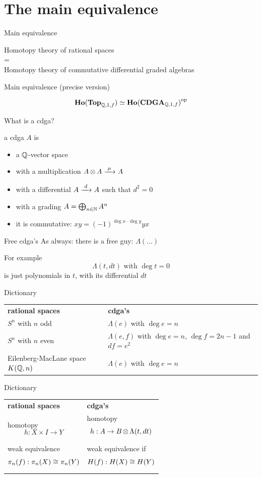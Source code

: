 \documentclass[14pt]{beamer}
\newcommand{\Frame}[2]{
	\begin{frame}{#1}#2\end{frame}
}
\begin{document}
\section{The main equivalence}
\Frame{Main equivalence}{
	\begin{theorem}
	\begin{center}
		Homotopy theory of rational spaces \\
		= \\
		Homotopy theory of commutative differential graded algebras
	\end{center}
	\end{theorem}
}

\Frame{Main equivalence (precise version)}{
	\begin{theorem}
		\[ \mathbf{Ho}(\mathbf{Top}_{\mathbb{Q}, 1, f}) \simeq {\mathbf{Ho}(\mathbf{CDGA}_{\mathbb{Q}, 1, f})}^{\text{op}} \]
	\end{theorem}
}

\Frame{What is a cdga?}{
	\begin{definition}
		a cdga $A$ is
		\begin{itemize}
			\item a $\mathbb{Q}$-vector space
			\item with a multiplication $A \operatorname*{\otimes} A \xrightarrow{\,\,{\mu}\,\,} A$
			\item with a differential $A \xrightarrow{\,\,{d}\,\,} A$ such that $d^2 = 0$
			\item with a grading $A = \bigoplus_{n \in \mathbb{N}} A^n$
			\item it is commutative: $ x y = (-1)^{\deg{x}\cdot\deg{y}} y x $
		\end{itemize}
	\end{definition}
}

\Frame{Free cdga's}{
	As always: there is a free guy: $\Lambda(...)$

	For example
	\[ \Lambda(t, dt) \text{ with } \deg{t} = 0 \]
	is just polynomials in $t$, with its differential $dt$
}

\newcommand{\Dict}[1]{
	\noindent
	\begin{tabularx}{\textwidth}{ X X }
		{\bf rational spaces} & {\bf cdga's} \\[1em]
		#1
	\end{tabularx}
}

\Frame{Dictionary}{
	\Dict{
		$S^n$ with $n$ odd
				& $\Lambda(e)$ with $\deg{e} = n$ \\[1em]

		$S^n$ with $n$ even
				& $\Lambda(e, f)$ with $\deg{e} = n$, $\deg{f} = 2n-1$ and $d f = e^2$ \\[1em]

		Eilenberg-MacLane space $K(\mathbb{Q}, n)$
				& $\Lambda(e)$ with $\deg{e} = n$
	}
}

\Frame{Dictionary}{
	\Dict{
		homotopy $$h: X \times I \to Y$$
				& homotopy $$h: A \to B \operatorname*{\otimes} \Lambda(t, dt)$$ \\[1em]

		weak equivalence $$\pi_n(f): \pi_n(X) \cong \pi_n(Y)$$
				& weak equivalence if $$H(f): H(X) \cong H(Y)$$
	}
}
\end{document}
